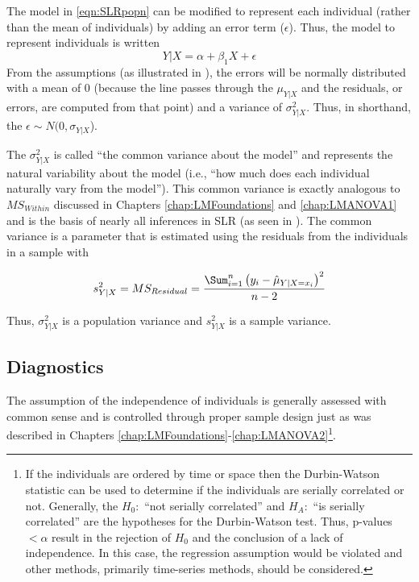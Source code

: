 \documentclass[10pt,openany]{book}\usepackage[]{graphicx}\usepackage[]{color}
\begin{document}
The model in \eqref{eqn:SLRpopn} can be modified to represent each individual (rather than the mean of individuals) by adding an error term ($\epsilon$).  Thus, the model to represent individuals is written
\begin{equation}\label{eqn:SLRpopnErr}
  Y|X = \alpha + \beta_{1}X + \epsilon
\end{equation}
From the assumptions (as illustrated in ), the errors will be normally distributed with a mean of 0 (because the line passes through the $\mu_{Y|X}$ and the residuals, or errors, are computed from that point) and a variance of $\sigma^{2}_{Y|X}$.  Thus, in shorthand, the $\epsilon\sim N(0,\sigma_{Y|X}$).


The $\sigma^{2}_{Y|X}$ is called ``the common variance about the model'' and represents the natural variability about the model (i.e., ``how much does each individual naturally vary from the model'').  This common variance is exactly analogous to $MS_{Within}$ discussed in Chapters \ref{chap:LMFoundations} and \ref{chap:LMANOVA1} and is the basis of nearly all inferences in SLR (as seen in ).  The common variance is a parameter that is estimated using the residuals from the individuals in a sample with

\[ s^{2}_{Y|X} = MS_{Residual} = \frac{\Sum_{i=1}^{n}\left(y_{i}-\hat{\mu}_{Y|X=x_{i}}\right)^{2}}{n-2} \]

Thus, $\sigma^{2}_{Y|X}$ is a population variance and $s^{2}_{Y|X}$ is a sample variance.

\subsection{Diagnostics}
The assumption of the independence of individuals is generally assessed with common sense and is controlled through proper sample design just as was described in Chapters \ref{chap:LMFoundations}-\ref{chap:LMANOVA2}\footnote{If the individuals are ordered by time or space then the Durbin-Watson statistic can be used to determine if the individuals are serially correlated or not.  Generally, the $H_{0}:$ ``not serially correlated'' and $H_{A}:$ ``is serially correlated'' are the hypotheses for the Durbin-Watson test.  Thus, p-values $<\alpha$ result in the rejection of $H_{0}$ and the conclusion of a lack of independence.  In this case, the regression assumption would be violated and other methods, primarily time-series methods, should be considered.}.
\end{document}
